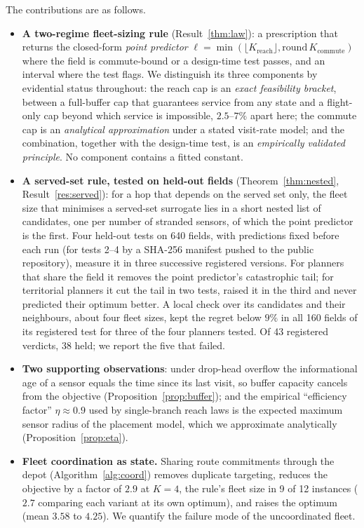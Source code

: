 \documentclass[journal,outdir=./]{IEEEtran}
\newcommand{\Kr}{K_{\mathrm{reach}}}
\newcommand{\Kc}{K_{\mathrm{commute}}}
\begin{document}
The contributions are as follows.
\begin{itemize}
\item \textbf{A two-regime fleet-sizing rule} (Result~\ref{thm:law}): a prescription that returns the closed-form \emph{point predictor} $\ell=\min(\lfloor\Kr\rfloor,\mathrm{round}\,\Kc)$ where the field is commute-bound or a design-time test passes, and an interval where the test flags. We distinguish its three components by evidential status throughout: the reach cap is an \emph{exact feasibility bracket}, between a full-buffer cap that guarantees service from any state and a flight-only cap beyond which service is impossible, $2.5$--$7\%$ apart here; the commute cap is an \emph{analytical approximation} under a stated visit-rate model; and the combination, together with the design-time test, is an \emph{empirically validated principle}. No component contains a fitted constant.
\item \textbf{A served-set rule, tested on held-out fields} (Theorem~\ref{thm:nested}, Result~\ref{res:served}): for a hop that depends on the served set only, the fleet size that minimises a served-set surrogate lies in a short nested list of candidates, one per number of stranded sensors, of which the point predictor is the first. Four held-out tests on 640 fields, with predictions fixed before each run (for tests 2--4 by a SHA-256 manifest pushed to the public repository), measure it in three successive registered versions. For planners that share the field it removes the point predictor's catastrophic tail; for territorial planners it cut the tail in two tests, raised it in the third and never predicted their optimum better. A local check over its candidates and their neighbours, about four fleet sizes, kept the regret below $9\%$ in all 160 fields of its registered test for three of the four planners tested. Of 43 registered verdicts, 38 held; we report the five that failed.
\item \textbf{Two supporting observations}: under drop-head overflow the informational age of a sensor equals the time since its last visit, so buffer capacity cancels from the objective (Proposition~\ref{prop:buffer}); and the empirical ``efficiency factor'' $\eta\approx0.9$ used by single-branch reach laws is the expected maximum sensor radius of the placement model, which we approximate analytically (Proposition~\ref{prop:eta}).
\item \textbf{Fleet coordination as state.} Sharing route commitments through the depot (Algorithm~\ref{alg:coord}) removes duplicate targeting, reduces the objective by a factor of $2.9$ at $K=4$, the rule's fleet size in 9 of 12 instances ($2.7$ comparing each variant at its own optimum), and raises the optimum (mean $3.58$ to $4.25$). We quantify the failure mode of the uncoordinated fleet.

\end{itemize}
\end{document}
